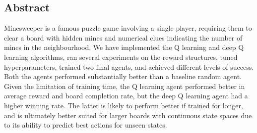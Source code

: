 \vspace{2cm}

\begin{center}
    \begin{minipage}{0.75\textwidth}
    \begin{center}\section*{Abstract}\end{center}
    Minesweeper is a famous puzzle game involving a single player, requiring them to clear a board with hidden mines and numerical clues indicating the number of mines in the neighbourhood. We have implemented the Q learning and deep Q learning algorithms, ran several experiments on the reward structures, tuned hyperparameters, trained two final agents, and achieved different levels of success. Both the agents performed substantially better than a baseline random agent. Given the limitation of training time, the Q learning agent performed better in average reward and board completion rate, but the deep Q learning agent had a higher winning rate. The latter is likely to perform better if trained for longer, and is ultimately better suited for larger boards with continuous state spaces due to its ability to predict best actions for unseen states.
    \end{minipage}
\end{center}

\thispagestyle{empty}